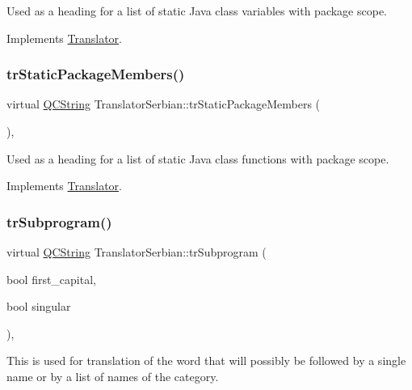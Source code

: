 Used as a heading for a list of static Java class variables with package scope. 

Implements \mbox{\hyperlink{class_translator}{Translator}}.

\mbox{\label{class_translator_serbian_af2b4207dfd795c1ef74d89bc1be04bdf}} 
\subsubsection{\texorpdfstring{trStaticPackageMembers()}{trStaticPackageMembers()}}
{\footnotesize\ttfamily virtual \mbox{\hyperlink{class_q_c_string}{Q\+C\+String}} Translator\+Serbian\+::tr\+Static\+Package\+Members (\begin{DoxyParamCaption}{ }\end{DoxyParamCaption})\hspace{0.3cm}{\ttfamily [inline]}, {\ttfamily [virtual]}}

Used as a heading for a list of static Java class functions with package scope. 

Implements \mbox{\hyperlink{class_translator}{Translator}}.

\mbox{\label{class_translator_serbian_a99350a0857e003977fc4fc7d2a4e90ed}} 
\subsubsection{\texorpdfstring{trSubprogram()}{trSubprogram()}}
{\footnotesize\ttfamily virtual \mbox{\hyperlink{class_q_c_string}{Q\+C\+String}} Translator\+Serbian\+::tr\+Subprogram (\begin{DoxyParamCaption}\item[{bool}]{first\+\_\+capital,  }\item[{bool}]{singular }\end{DoxyParamCaption})\hspace{0.3cm}{\ttfamily [inline]}, {\ttfamily [virtual]}}

This is used for translation of the word that will possibly be followed by a single name or by a list of names of the category. 

